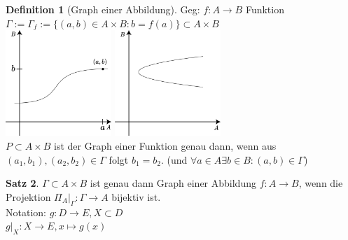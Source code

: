 \documentclass[12pt,a4paper,titlepage]{article} %
\theoremstyle{definition}
\newtheorem{satz}{Satz}[subsection]
\newtheorem{defi}[satz]{Definition}
\theoremstyle{remark}
\begin{document}
\begin{defi}[Graph einer Abbildung]
	Geg: $f: A \rightarrow B$ Funktion\\
	$\Gamma := \Gamma_f := \{(a,b) \in A\times B : b = f(a)\} \subset A\times B$\\
	\includegraphics[width=0.3\textwidth]{images/img05.png}
	\quad
	\includegraphics[width=0.3\textwidth]{images/img06.png}\\
	$P\subset A\times B$ ist der Graph einer Funktion genau dann, wenn aus $(a_1,b_1), (a_2,b_2) \in \Gamma$ folgt $b_1 = b_2$. (und $\forall a\in A \exists b\in B:(a,b)\in\Gamma$)
\end{defi}
\begin{satz}
	$\Gamma \subset A\times B$ ist genau dann Graph einer Abbildung $f: A\rightarrow B$, wenn die Projektion $\Pi_A \vert_\Gamma : \Gamma \rightarrow A$ bijektiv ist.\\
	Notation: $g: D \rightarrow E, X\subset D$\\
	$g\vert_X: X\rightarrow E, x\mapsto g(x)$\\
\end{satz}
\end{document}
